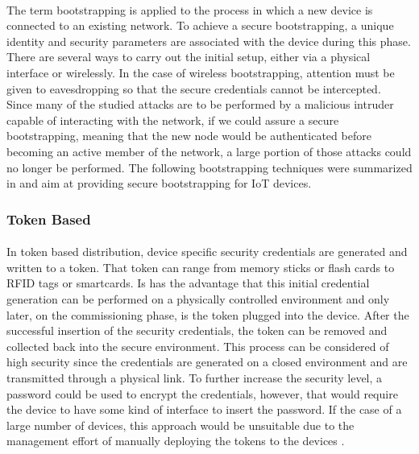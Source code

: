 \paragraph{}
The term bootstrapping is applied to the process in which a new device is connected to an existing network. To achieve a secure bootstrapping, a unique identity and security parameters are associated with the device during this phase. There are several ways to carry out the initial setup, either via a physical interface or wirelessly. In the case of wireless bootstrapping, attention must be given to eavesdropping so that the secure credentials cannot be intercepted.\\
Since many of the studied attacks are to be performed by a malicious intruder capable of interacting with the network, if we could assure a secure bootstrapping, meaning that the new node would be authenticated before becoming an active member of the network, a large portion of those attacks could no longer be performed. The following bootstrapping techniques were summarized in \cite{Fischer2012} and aim at providing secure bootstrapping for \ac{IoT} devices.

\subsubsection{Token Based}
\paragraph{}
In token based distribution, device specific security credentials are generated and written to a token. That token can range from memory sticks or flash cards to \ac{RFID} tags or smartcards. Is has the advantage that this initial credential generation can be performed on a physically controlled environment and only later, on the commissioning phase, is the token plugged into the device. After the successful insertion of the security credentials, the token can be removed and collected back into the secure environment. This process can be considered of high security since the credentials are generated on a closed environment and are transmitted through a physical link. To further increase the security level, a password could be used to encrypt the credentials, however, that would require the device to have some kind of interface to insert the password. If the case of a large number of devices, this approach would be unsuitable due to the management effort of manually deploying the tokens to the devices \cite{Fischer2012}.

